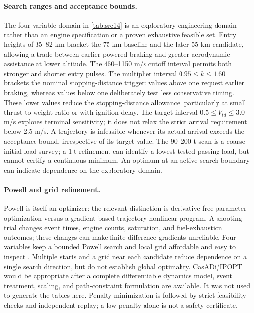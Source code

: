 \documentclass[11pt,a4paper]{article}
\begin{document}
\paragraph{Search ranges and acceptance bounds.}
The four-variable domain in \cref{tab:src14} is an exploratory engineering domain rather than an engine specification or a proven exhaustive feasible set. Entry heights of 35--82 km bracket the 75 km baseline and the later 55 km candidate, allowing a trade between earlier powered braking and greater aerodynamic assistance at lower altitude. The 450--1150 m/s cutoff interval permits both stronger and shorter entry pulses. The multiplier interval $0.95\le k\le1.60$ brackets the nominal stopping-distance trigger: values above one request earlier braking, whereas values below one deliberately test less conservative timing. These lower values reduce the stopping-distance allowance, particularly at small thrust-to-weight ratio or with ignition delay. The target interval $0.5\le V_{td}\le3.0$ m/s explores terminal sensitivity; it does not relax the strict arrival requirement below 2.5 m/s. A trajectory is infeasible whenever its actual arrival exceeds the acceptance bound, irrespective of its target value. The 90--200 t scan is a coarse initial-load survey; a 1 t refinement can identify a lowest tested passing load, but cannot certify a continuous minimum. An optimum at an active search boundary can indicate dependence on the exploratory domain.

\paragraph{Powell and grid refinement.}
Powell is itself an optimizer: the relevant distinction is derivative-free parameter optimization versus a gradient-based trajectory nonlinear program. A shooting trial changes event times, engine counts, saturation, and fuel-exhaustion outcomes; these changes can make finite-difference gradients unreliable. Four variables keep a bounded Powell search and local grid affordable and easy to inspect \cite{powell,scipy}. Multiple starts and a grid near each candidate reduce dependence on a single search direction, but do not establish global optimality. CasADi/IPOPT would be appropriate after a complete differentiable dynamics model, event treatment, scaling, and path-constraint formulation are available. It was not used to generate the tables here. Penalty minimization is followed by strict feasibility checks and independent replay; a low penalty alone is not a safety certificate.
\end{document}
